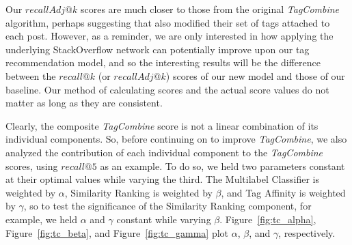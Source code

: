 \documentclass[10pt]{IEEEtran}
\begin{document}
Our $recallAdj@k$ scores are much closer to those from the original \textit{TagCombine} algorithm, perhaps suggesting that \cite{1} also modified their set of tags attached to each post. However, as a reminder, we are only interested in how applying the underlying StackOverflow network can potentially improve upon our tag recommendation model, and so the interesting results will be the difference between the $recall@k$ (or $recallAdj@k$) scores of our new model and those of our baseline. Our method of calculating scores and the actual score values do not matter as long as they are consistent.

Clearly, the composite \textit{TagCombine} score is not a linear combination of its individual components. So, before continuing on to improve \textit{TagCombine}, we also analyzed the contribution of each individual component to the \textit{TagCombine} scores, using $recall@5$ as an example. To do so, we held two parameters constant at their optimal values while varying the third. The Multilabel Classifier is weighted by $\alpha$, Similarity Ranking is weighted by $\beta$, and Tag Affinity is weighted by $\gamma$, so to test the significance of the Similarity Ranking component, for example, we held $\alpha$ and $\gamma$ constant while varying $\beta$. Figure~\ref{fig:tc_alpha}, Figure~\ref{fig:tc_beta}, and Figure~\ref{fig:tc_gamma} plot $\alpha$, $\beta$, and $\gamma$, respectively.
\end{document}
